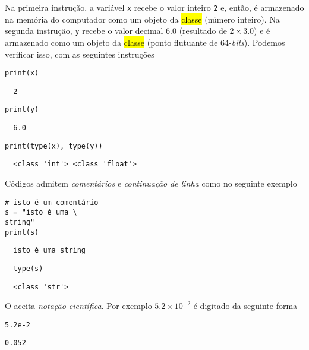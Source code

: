 \documentclass[12pt]{article}
\begin{document}
Na primeira instrução, a variável \texttt{x} recebe o valor inteiro \texttt{2} e, então, é armazenado na memória do computador como um objeto da \hl{classe {\PYTHONint}} (número inteiro). Na segunda instrução, \texttt{y} recebe o valor decimal $6.0$ (resultado de $2\times 3.0$) e é armazenado como um objeto da \hl{classe {\PYTHONfloat}} (ponto flutuante de 64-{\it bits}). Podemos verificar isso, com as seguintes instruções

\begin{lstlisting}
print(x)
\end{lstlisting}

\begin{verbatim}
  2
\end{verbatim}

\begin{lstlisting}
print(y)
\end{lstlisting}

\begin{verbatim}
  6.0
\end{verbatim}

\begin{lstlisting}
print(type(x), type(y))
\end{lstlisting}

\begin{verbatim}
  <class 'int'> <class 'float'>
\end{verbatim}

\begin{obs}
  Códigos {\python} admitem \emph{comentários} e \emph{continuação de linha} como no seguinte exemplo

\begin{lstlisting}
# isto é um comentário
s = "isto é uma \
string"
print(s)
\end{lstlisting}

\begin{verbatim}
  isto é uma string
\end{verbatim}

\begin{lstlisting}
  type(s)
\end{lstlisting}

\begin{verbatim}
  <class 'str'>
\end{verbatim}

\end{obs}

\begin{obs}
  O {\python} aceita \emph{notação científica}. Por exemplo $5.2\times 10^{-2}$ é digitado da seguinte forma

\begin{lstlisting}
5.2e-2
\end{lstlisting}

\begin{verbatim}
0.052
\end{verbatim}

\end{obs}
\end{document}
